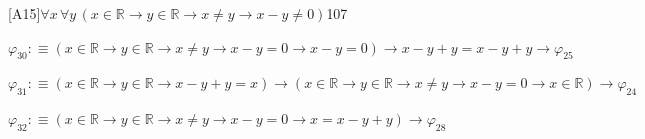 \begin{fullproof}{[A15]}{$\forall x\,\forall y\,(x \in \mathbb{R} \to y \in \mathbb{R} \to x \neq y \to x - y \neq 0)$}{107}
\begin{abbrevlist}
\item $\varphi_{30} :\equiv (x \in \mathbb{R} \to y \in \mathbb{R} \to x \neq y \to x - y = 0 \to x - y = 0) \to x - y + y = x - y + y \to \varphi_{25}$
\item $\varphi_{31} :\equiv (x \in \mathbb{R} \to y \in \mathbb{R} \to x - y + y = x) \to (x \in \mathbb{R} \to y \in \mathbb{R} \to x \neq y \to x - y = 0 \to x \in \mathbb{R}) \to \varphi_{24}$
\item $\varphi_{32} :\equiv (x \in \mathbb{R} \to y \in \mathbb{R} \to x \neq y \to x - y = 0 \to x = x - y + y) \to \varphi_{28}$
\end{abbrevlist}
\end{fullproof}
